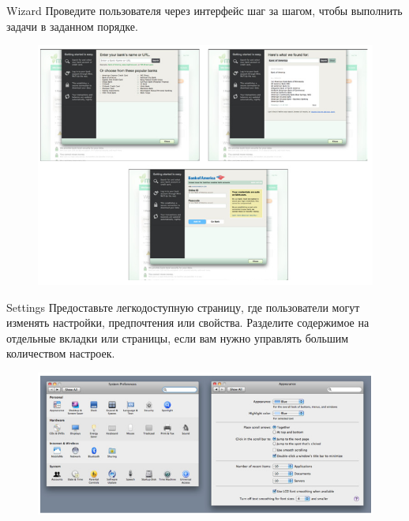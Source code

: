 \documentclass{beamer}
\begin{document}
\begin{frame}[t]{Wizard}
	Проведите пользователя через интерфейс шаг за шагом, чтобы выполнить задачи в заданном порядке.
	\begin{figure}[h]
		\centering
		\includegraphics[scale=0.6]{images/lec07-pic10.png}
	\end{figure}
\end{frame} 

\begin{frame}[t]{Settings}
	Предоставьте легкодоступную страницу, где пользователи могут изменять настройки,
предпочтения или свойства. Разделите содержимое на отдельные вкладки или страницы, если вам нужно управлять большим количеством настроек.
	\begin{figure}[h]
		\centering
		\includegraphics[scale=0.6]{images/lec07-pic11.png}
	\end{figure}
\end{frame} 
\end{document}
